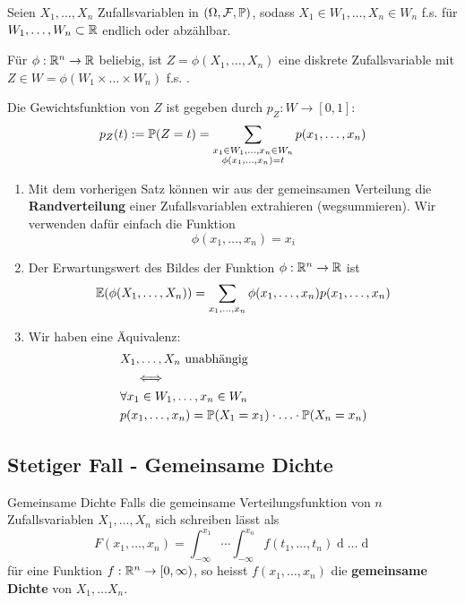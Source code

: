 \begin{subbox}{}
    Seien $X_1, \ldots, X_n$  Zufallsvariablen in $(\Omega, \F, \P)$, sodass $X_1 \in W_1, \ldots, X_n \in W_n$ f.s. für $W_1, \ldots, W_n \subset \R$ endlich oder abzählbar.

    Für $\phi: \R^n \to \R$ beliebig, ist $Z = \phi(X_1, \ldots, X_n)$ eine diskrete Zufallsvariable mit $Z \in W = \phi(W_1 \times \ldots \times W_n)$ f.s. . 

    Die Gewichtsfunktion von $Z$ ist gegeben durch $p_Z: W \to [0,1]$:
    $$p_Z(t) := \P(Z = t) = \sum_{\substack{x_1 \in W_1, \ldots, x_n \in W_n\\ \phi(x_1, \ldots, x_n) = t}} p(x_1, \ldots, x_n)$$
\end{subbox}
\begin{enumerate}
    \item Mit dem vorherigen Satz können wir aus der gemeinsamen Verteilung die \textbf{Randverteilung} einer Zufallsvariablen extrahieren (wegsummieren). Wir verwenden dafür einfach die Funktion 
    $$\phi(x_1, \ldots, x_n) = x_i$$
    \item Der Erwartungswert des Bildes der Funktion $\phi: \R^n \to \R$ ist
    $$\E(\phi(X_1, \ldots, X_n)) = \sum_{x_1, \ldots, x_n}\phi(x_1, \ldots, x_n)p(x_1, \ldots, x_n)$$
    \item Wir haben eine Äquivalenz: 
    \begin{align*}
        &X_1, \ldots, X_n \text{ unabhängig}\\
        &\quad \iff \\
        &\forall x_1 \in W_1, \ldots, x_n \in W_n\\
        &p(x_1, \ldots, x_n) = \P(X_1 = x_1) \cdot \ldots \cdot \P(X_n = x_n)
    \end{align*}
\end{enumerate}

\subsection{Stetiger Fall - Gemeinsame Dichte}
\begin{mainbox}{Gemeinsame Dichte}
    Falls die gemeinsame Verteilungsfunktion von $n$ Zufallsvariablen $X_1, \ldots, X_n$ sich schreiben lässt als
    $$F(x_1, \ldots, x_n) = \int_{-\infty}^{x_1} \cdots \int_{-\infty}^{x_n}f(t_1, \ldots, t_n) \mathop{dt_n}\ldots\mathop{dt_1}$$
    für eine Funktion $f: \R^n \to [0, \infty)$, so heisst $f(x_1, \ldots, x_n)$ die \textbf{gemeinsame Dichte} von $X_1, \ldots X_n$.
\end{mainbox}
   
